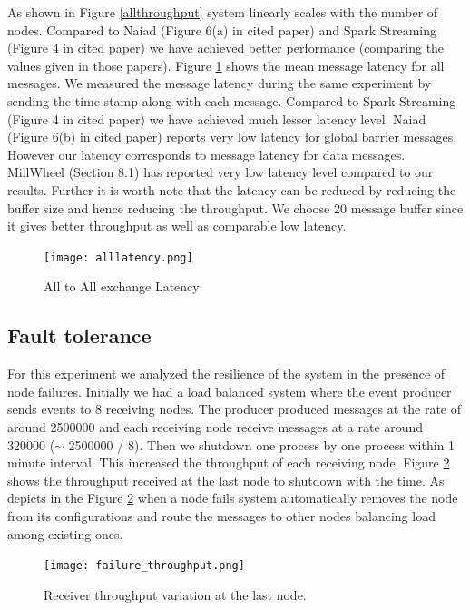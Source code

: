 As shown in Figure \ref{allthroughput} system linearly scales with the number of nodes.  Compared to Naiad (Figure 6(a) in cited paper) \cite{murray2013naiad} and Spark Streaming (Figure 4 in cited paper) \cite{zaharia2013discretized} we have achieved better performance (comparing the values given in those papers).  Figure \ref{alllatency} shows the mean message latency for all messages. We measured the message latency during the same experiment by sending the time stamp along with each message. Compared to Spark Streaming (Figure 4 in cited paper) \cite{zaharia2013discretized} we have achieved much lesser latency level. Naiad (Figure 6(b) in cited paper) \cite{murray2013naiad} reports very low latency for global barrier messages. However our latency corresponds to message latency for data messages. MillWheel (Section 8.1) \cite{akidau2013millwheel} has reported very low latency level compared to our results. Further it is worth note that the latency can be reduced by reducing the buffer size and hence reducing the throughput. We choose 20 message buffer since it gives better throughput as well as comparable low latency.

\begin{figure}[!t]
        \centering
        \texttt{[image: alllatency.png]}
        \caption{All to All exchange Latency}
        \label{alllatency}
\end{figure}


\subsection{Fault tolerance}
For this experiment we analyzed the resilience of the system in the presence of node failures. Initially we had a load balanced system where the event producer sends events to 8 receiving nodes. The producer produced messages at the rate of around 2500000 and each receiving node receive messages at a rate around 320000 ($\sim$ 2500000 / 8). Then we shutdown one process by one process within 1 minute interval. This increased the throughput of each receiving node. Figure \ref{rthroughput} shows the throughput received at the last node to shutdown with the time. As depicts in the Figure \ref{rthroughput} when a node fails system automatically removes the node from its configurations and route the messages to other nodes balancing load among existing ones.

\begin{figure}[!t]
        \centering
        \texttt{[image: failure\_throughput.png]}
        \caption{Receiver throughput variation at the last node.}
        \label{rthroughput}
\end{figure}

